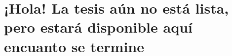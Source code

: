 \documentclass{article}
\begin{document}
\thispagestyle{empty}

\section*{\centering ¡Hola! La tesis aún no está lista, pero estará disponible aquí encuanto se termine}
\end{document}

